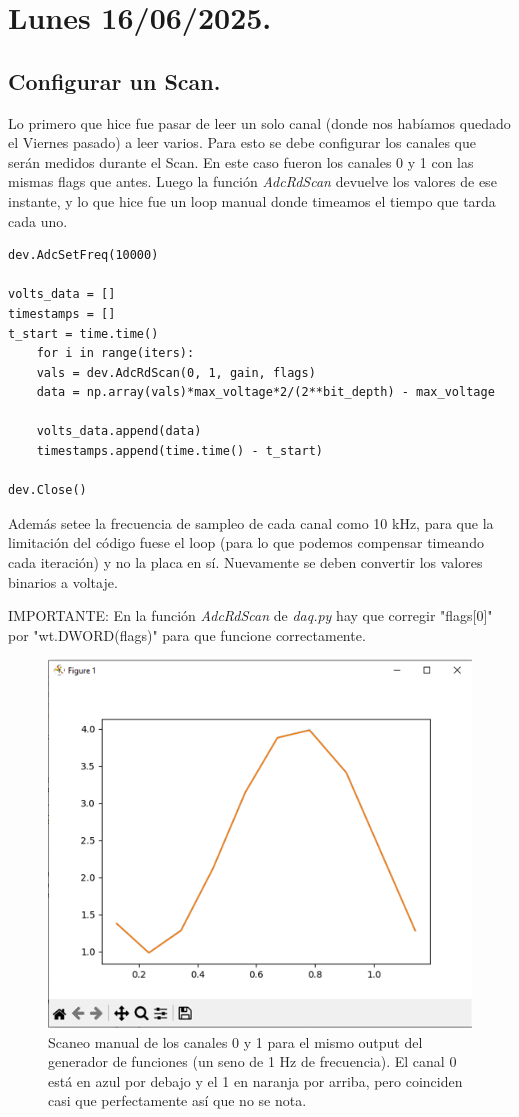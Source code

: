 \section{Lunes 16/06/2025.}
\subsection*{Configurar un Scan.}

Lo primero que hice fue pasar de leer un solo canal (donde nos habíamos quedado el Viernes pasado) a leer varios. Para esto se debe configurar los canales que serán medidos durante el Scan. En este caso fueron los canales 0 y 1 con las mismas flags que antes. Luego la función \textit{AdcRdScan} devuelve los valores de ese instante, y lo que hice fue un loop manual donde timeamos el tiempo que tarda cada uno.

\begin{lstlisting}
dev.AdcSetFreq(10000)

volts_data = []
timestamps = []
t_start = time.time()
	for i in range(iters):
	vals = dev.AdcRdScan(0, 1, gain, flags)
	data = np.array(vals)*max_voltage*2/(2**bit_depth) - max_voltage
	
	volts_data.append(data)
	timestamps.append(time.time() - t_start)

dev.Close()

\end{lstlisting}

Además setee la frecuencia de sampleo de cada canal como 10 kHz, para que la limitación del código fuese el loop (para lo que podemos compensar timeando cada iteración) y no la placa en sí. Nuevamente se deben convertir los valores binarios a voltaje. 

IMPORTANTE: En la función \textit{AdcRdScan} de \textit{daq.py} hay que corregir "flags[0]" por "wt.DWORD(flags)" para que funcione correctamente. 

\begin{figure}[th!]
	\centering
	\includegraphics[width=0.415\linewidth]{Figures/09_06_2025/Scan_2_canales_manual}
	\caption{Scaneo manual de los canales 0 y 1 para el mismo output del generador de funciones (un seno de 1 Hz de frecuencia). El canal 0 está en azul por debajo y el 1 en naranja por arriba, pero coinciden casi que perfectamente así que no se nota.}
	\label{fig:scan2canalesmanual}
\end{figure}


